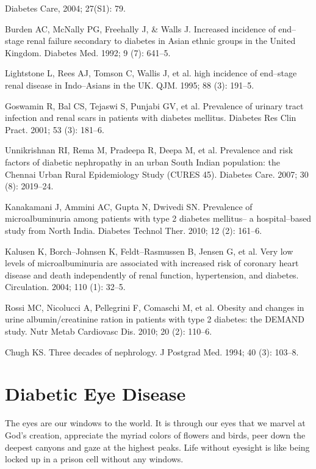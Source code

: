 \begin{thebibliography}{99}
 Diabetes Care, 2004; 27(S1): 79.

  Burden AC, McNally PG, Freehally J, \& Walls J. Increased incidence of end–stage renal failure secondary to diabetes in Asian ethnic groups in the United Kingdom. Diabetes Med. 1992; 9 (7): 641–5.

  Lightstone L, Rees AJ, Tomson C, Wallis J, et al. high incidence of end–stage renal disease in Indo–Asians in the UK. QJM. 1995; 88 (3): 191–5.

  Goswamin R, Bal CS, Tejaswi S, Punjabi GV, et al. Prevalence of urinary tract infection and renal scars in patients with diabetes mellitus. Diabetes Res Clin Pract. 2001; 53 (3): 181–6.

  Unnikrishnan RI, Rema M, Pradeepa R, Deepa M, et al. Prevalence and risk factors of diabetic nephropathy in an urban South Indian population: the Chennai Urban Rural Epidemiology Study (CURES 45). Diabetes Care. 2007; 30 (8): 2019–24.

  Kanakamani J, Ammini AC, Gupta N, Dwivedi SN. Prevalence of microalbuminuria among patients with type 2 diabetes mellitus– a hospital–based study from North India. Diabetes Technol Ther. 2010; 12 (2): 161–6.

  Kalusen K, Borch–Johnsen K, Feldt–Rasmussen B, Jensen G, et al. Very low levels of microalbuminuria are associated with increased risk of coronary heart disease and death independently of renal function, hypertension, and diabetes. Circulation. 2004; 110 (1): 32–5.

  Rossi MC, Nicolucci A, Pellegrini F, Comaschi M, et al. Obesity and changes in urine albumin/creatinine ration in patients with type 2 diabetes: the DEMAND study. Nutr Metab Cardiovasc Dis. 2010; 20 (2): 110–6.

  Chugh KS. Three decades of nephrology. J Postgrad Med. 1994; 40 (3): 103–8.

 \end{thebibliography}


\chapter{Diabetic Eye Disease}

The eyes are our windows to the world. It is through our eyes that we marvel at God’s creation, appreciate the myriad colors of flowers and birds, peer down the deepest canyons and gaze at the highest peaks. Life without eyesight is like being locked up in a prison cell without any windows.

